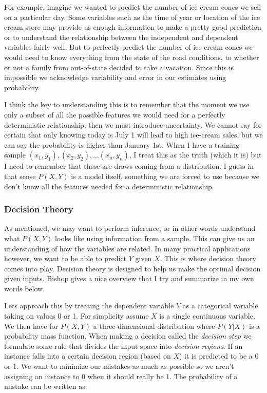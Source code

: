 \documentclass[paper=a4, fontsize=11pt]{scrartcl} %
\numberwithin{equation}{section} %
\numberwithin{figure}{section} %
\numberwithin{table}{section} %
\begin{document}
For example, imagine we wanted to predict the number of ice cream cones we sell on a particular day. Some variables such as the time of year or location of the ice cream store may provide us enough information to make a pretty good prediction or to understand the relationship between the independent and dependent variables fairly well. But to perfectly predict the number of ice cream cones we would need to know everything from the state of the road conditions, to whether or not a family from out-of-state decided to take a vacation. Since this is impossible we acknowledge variability and error in our estimates using probability.

I think the key to understanding this is to remember that the moment we use only a subset of all the possible features we would need for a perfectly deterministic relationship, then we must introduce uncertainty. We cannot say for certain that only knowing today is July 1 will lead to high ice-cream sales, but we can say the probability is higher than January 1st. When I have a training sample $(x_1, y_1), (x_2, y_2), ... (x_n, y_n)$,  I treat this as the truth (which it is) but I need to remember that these are draws coming from a distribution. I guess in that sense $P(X,Y)$ is a model itself, something we are forced to use because we don't know all the features needed for a deterministic relationship.

\subsubsection{Decision Theory}
As mentioned, we may want to perform inference, or in other words understand what $P(X,Y)$ looks like using information from a sample.  This can give us an understanding of how the variables are related. In many practical applications however, we want to be able to predict $Y$ given $X$. This is where decision theory comes into play. Decision theory is designed to help us make the optimal decision given inputs. Bishop gives a nice overview that I try and summarize in my own words below.

Lets approach this by treating the dependent variable $Y$ as a categorical variable taking on values 0 or 1. For simplicity assume $X$ is a single continuous variable. We then have for $P(X,Y)$ a three-dimensional distribution where $P(Y|X)$ is a probability mass function. When making a decision called the \emph{decision step} we formulate some rule that divides the input space into \emph{decision regions}. If an instance falls into a certain decision region (based on $X$) it is predicted to be a 0 or 1. We want to minimize our mistakes as much as possible so we aren't assigning an instance to 0 when it should really be 1. The probability of a mistake can be written as:
\end{document}
